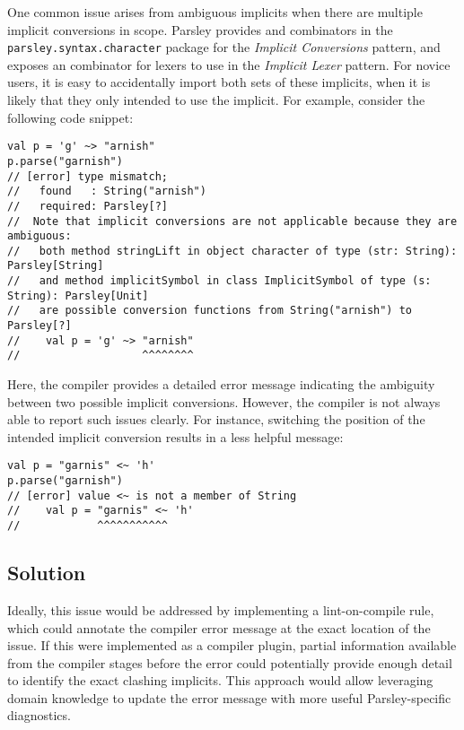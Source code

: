 \documentclass[../../main.tex]{subfiles}
\begin{document}
One common issue arises from ambiguous implicits when there are multiple implicit conversions in scope.
Parsley provides  and  combinators in the \texttt{parsley.syntax.character} package for the \emph{Implicit Conversions} pattern,
and exposes an  combinator for lexers to use in the \emph{Implicit Lexer} pattern.
For novice users, it is easy to accidentally import both sets of these implicits, when it is likely that they only intended to use the  implicit. %
For example, consider the following code snippet:
\begin{verbatim}
val p = 'g' ~> "arnish"
p.parse("garnish")
// [error] type mismatch;
//   found   : String("arnish")
//   required: Parsley[?]
//  Note that implicit conversions are not applicable because they are ambiguous:
//   both method stringLift in object character of type (str: String): Parsley[String]
//   and method implicitSymbol in class ImplicitSymbol of type (s: String): Parsley[Unit]
//   are possible conversion functions from String("arnish") to Parsley[?]
//    val p = 'g' ~> "arnish"
//                   ^^^^^^^^
\end{verbatim}
%
Here, the compiler provides a detailed error message indicating the ambiguity between two possible implicit conversions.
However, the compiler is not always able to report such issues clearly. For instance, switching the position of the intended implicit conversion results in a less helpful message:
\begin{verbatim}
val p = "garnis" <~ 'h'
p.parse("garnish")
// [error] value <~ is not a member of String
//    val p = "garnis" <~ 'h'
//            ^^^^^^^^^^^
\end{verbatim}

\subsection*{Solution}
Ideally, this issue would be addressed by implementing a lint-on-compile rule, which could annotate the compiler error message at the exact location of the issue.
If this were implemented as a compiler plugin, partial information available from the compiler stages before the error could potentially provide enough detail to identify the exact clashing implicits.
This approach would allow leveraging domain knowledge to update the error message with more useful Parsley-specific diagnostics.
\end{document}
